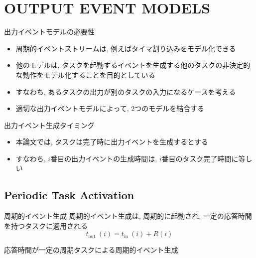 
\section{OUTPUT EVENT MODELS}
\label{sec: output event models}

\begin{frame}{出力イベントモデルの必要性}
    \begin{itemize}
        \item 周期的イベントストリームは, 例えばタイマ割り込みをモデル化できる
        \item 他のモデルは, タスクを起動するイベントを生成する他のタスクの非決定的な動作をモデル化することを目的としている
        \item すなわち, あるタスクの出力が別のタスクの入力になるケースを考える
        \item 適切な出力イベントモデルによって, 2つのモデルを結合する
    \end{itemize}
\end{frame}

\begin{frame}{出力イベント生成タイミング}
    \begin{itemize}
        \item 本論文では, タスクは完了時に出力イベントを生成するとする
        \item すなわち, $i$番目の出力イベントの生成時間は, $i$番目のタスク完了時間に等しい
    \end{itemize}
\end{frame}



\subsection{Periodic Task Activation}
\label{ssec: periodic task activation}

\begin{frame}{周期的イベント生成}
    周期的イベント生成は, 周期的に起動され, 一定の応答時間を持つタスクに適用される
    \begin{equation*}
        t_{\text {out }}(i)=t_{\text {in }}(i)+R(i)
    \end{equation*}
\end{frame}

\begin{frame}{応答時間が一定の周期タスクによる周期的イベント生成}
\end{frame}

